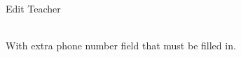 
\begin{uc}{Edit Teacher}


     \\
    With extra phone number field that must be filled in.

\end{uc}
